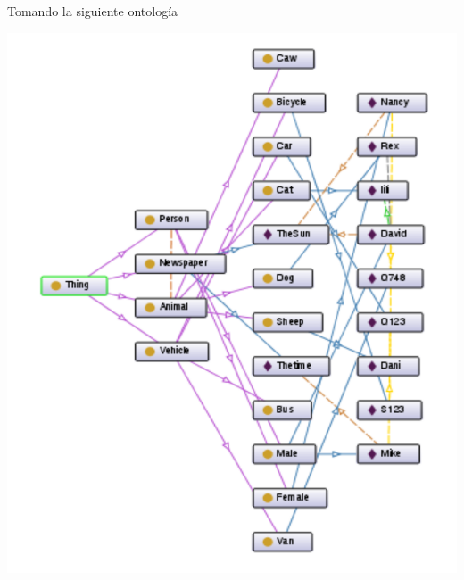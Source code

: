 \documentclass{fancyslides}
\begin{document}
\begin{frame}
\misc
{

\justifying Tomando la siguiente ontología

\begin{center}
\includegraphics[scale=0.15]{ontology}
\end{center}

}
\end{frame}
\end{document}
